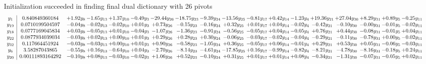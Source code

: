 \documentclass[9pt]{article}
\begin{document}
Initialization succeeded in finding final dual dictionary with 26 pivots
\[\begin{array}{c| c c@{\hskip 2pt} c@{\hskip 2pt} c@{\hskip 2pt} c@{\hskip 2pt} c@{\hskip 2pt} c@{\hskip 2pt} c@{\hskip 2pt} c@{\hskip 2pt} c@{\hskip 2pt} c@{\hskip 2pt} c@{\hskip 2pt} c@{\hskip 2pt} c@{\hskip 2pt} c@{\hskip 2pt} c@{\hskip 2pt} c@{\hskip 2pt} }
 y_{1}   &  0.840849360184 & +  1.92 y_{8} & -1.65 y_{13} & +  1.37 y_{10} & -0.49 y_{3} & -29.44 y_{26} & -18.75 y_{23} & -9.39 y_{24} & -13.56 y_{25} & -0.81 y_{17} & +  0.42 y_{14} & -1.23 y_{4} & + 19.36 y_{21} & + 27.04 y_{30} & +  8.29 y_{31} & +  0.89 y_{5} & -0.25 y_{11}\\
 y_{19}   &  0.0710199504597 & -0.04 y_{8} & -0.02 y_{13} & -0.02 y_{10} & +  0.01 y_{3} & +  0.73 y_{26} & -0.15 y_{23} & -0.16 y_{24} & +  0.32 y_{25} & +  0.01 y_{17} & +  0.04 y_{14} & -0.02 y_{4} & -0.42 y_{21} & -0.10 y_{30} & -0.00 y_{31} & -0.01 y_{5} & -0.02 y_{11}\\
 y_{18}   &  0.0777169045834 & +  0.03 y_{8} & -0.05 y_{13} & +  0.01 y_{10} & -0.04 y_{3} & -1.07 y_{26} & -1.36 y_{23} & -0.91 y_{24} & -0.56 y_{25} & -0.05 y_{17} & +  0.04 y_{14} & -0.05 y_{4} & +  0.76 y_{21} & +  0.44 y_{30} & -0.08 y_{31} & -0.01 y_{5} & +  0.04 y_{11}\\
 y_{22}   &  0.0877934039034 & -0.03 y_{8} & +  0.02 y_{13} & +  0.00 y_{10} & +  0.01 y_{3} & +  0.29 y_{26} & +  0.28 y_{23} & +  0.30 y_{24} & -0.06 y_{25} & -0.03 y_{17} & -0.02 y_{14} & -0.04 y_{4} & -0.29 y_{21} & -0.11 y_{30} & -0.78 y_{31} & +  0.00 y_{5} & -0.02 y_{11}\\
 y_{32}   &  0.117664451924 & -0.03 y_{8} & -0.03 y_{13} & +  0.00 y_{10} & +  0.01 y_{3} & +  0.90 y_{26} & -0.58 y_{23} & -1.05 y_{24} & +  0.36 y_{25} & -0.05 y_{17} & +  0.06 y_{14} & -0.01 y_{4} & +  0.29 y_{21} & +  0.53 y_{30} & +  0.05 y_{31} & -0.06 y_{5} & -0.03 y_{11}\\
 y_{6}   &  3.58287043865 & -0.55 y_{8} & +  0.16 y_{13} & -0.64 y_{10} & +  0.04 y_{3} & -2.70 y_{26} & -8.14 y_{23} & -4.61 y_{24} & -17.85 y_{25} & +  0.16 y_{17} & -0.99 y_{14} & -0.82 y_{4} & -8.21 y_{21} & -4.78 y_{30} & -8.16 y_{31} & -0.18 y_{5} & +  0.24 y_{11}\\
 y_{20}   &  0.00111893164292 & -0.10 y_{8} & +  0.08 y_{13} & -0.03 y_{10} & -0.02 y_{3} & +  1.06 y_{26} & +  0.52 y_{23} & -0.10 y_{24} & +  0.31 y_{25} & +  0.01 y_{17} & +  0.01 y_{14} & +  0.08 y_{4} & -0.34 y_{21} & -1.31 y_{30} & -0.07 y_{31} & -0.05 y_{5} & +  0.02 y_{11}\\

\end{array}\]
\end{document}
